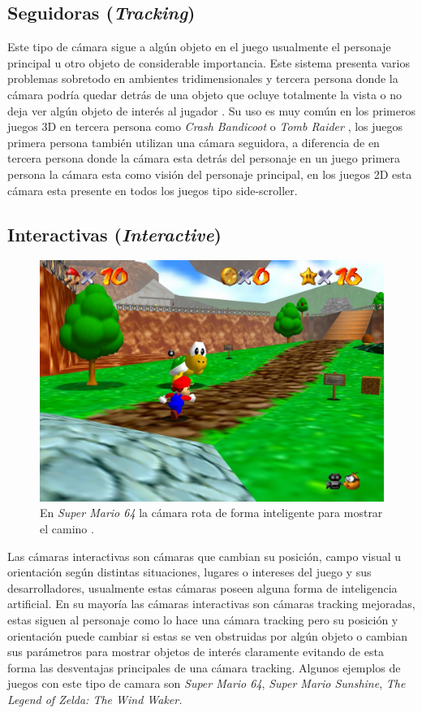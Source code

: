 \subsection{Seguidoras (\emph{Tracking})}
Este tipo de cámara sigue a algún objeto en el juego usualmente el personaje principal u otro objeto de considerable importancia. Este sistema presenta varios problemas sobretodo en ambientes tridimensionales y tercera persona donde la cámara podría quedar detrás de una objeto que ocluye totalmente la vista o no deja ver algún objeto de interés al jugador \cite{fund_gamedesign}. Su uso es muy común en los primeros juegos 3D en tercera persona como \emph{Crash Bandicoot} \cite{crashbandicoot} o \emph{Tomb Raider} \cite[p.~39]{bobbatesgamedesign}, los juegos primera persona también utilizan una cámara seguidora, a diferencia de en tercera persona donde la cámara esta detrás del personaje en un juego primera persona la cámara esta como visión del personaje principal, en los juegos 2D esta cámara esta presente en todos los juegos tipo side-scroller.
\newpage
\subsection{Interactivas (\emph{Interactive})}
\begin{figure}
\includegraphics[width=\linewidth]{semana2/supermario64.jpg} 
\caption{En \emph{Super Mario 64} la cámara rota de forma inteligente para mostrar el camino \cite{supermario64}.}
\end{figure}
Las cámaras interactivas son cámaras que cambian su posición, campo visual u orientación según distintas situaciones, lugares o intereses del juego y sus desarrolladores, usualmente estas cámaras poseen alguna forma de inteligencia artificial. En su mayoría las cámaras interactivas son cámaras tracking mejoradas, estas siguen al personaje como lo hace una cámara tracking pero su posición y orientación puede cambiar si estas se ven obstruidas por algún objeto o cambian sus parámetros para mostrar objetos de interés claramente evitando de esta forma las desventajas principales de una cámara tracking. Algunos ejemplos de juegos con este tipo de camara son \emph{Super Mario 64}, \emph{Super Mario Sunshine}, \emph{The Legend of Zelda: The Wind Waker.}
